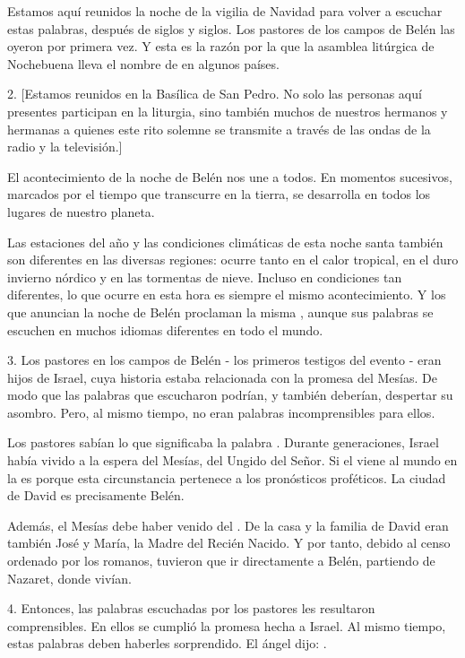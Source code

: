 \begin{body}
\begin{body}
		Estamos aquí reunidos la noche de la vigilia de Navidad para volver a escuchar estas palabras, después de siglos y siglos. Los pastores de los campos de Belén las oyeron por primera vez. Y esta es la razón por la que la asamblea litúrgica de Nochebuena lleva el nombre de  en algunos países.
		
		2. {[}Estamos reunidos en la Basílica de San Pedro. No solo las personas aquí presentes participan en la liturgia, sino también muchos de nuestros hermanos y hermanas a quienes este rito solemne se transmite a través de las ondas de la radio y la televisión.{]}
		
		El acontecimiento de la noche de Belén nos une a todos. En momentos sucesivos, marcados por el tiempo que transcurre en la tierra, se desarrolla en todos los lugares de nuestro planeta.
		
		Las estaciones del año y las condiciones climáticas de esta noche santa también son diferentes en las diversas regiones: ocurre tanto en el calor tropical, en el duro invierno nórdico y en las tormentas de nieve. Incluso en condiciones tan diferentes, lo que ocurre en esta hora es siempre el mismo acontecimiento. Y los que anuncian la noche de Belén proclaman la misma , aunque sus palabras se escuchen en muchos idiomas diferentes en todo el mundo.
		
		3. Los pastores en los campos de Belén - los primeros testigos del evento - eran hijos de Israel, cuya historia estaba relacionada con la promesa del Mesías. De modo que las palabras que escucharon podrían, y también deberían, despertar su asombro. Pero, al mismo tiempo, no eran palabras incomprensibles para ellos.
		
		Los pastores sabían lo que significaba la palabra . Durante generaciones, Israel había vivido a la espera del Mesías, del Ungido del Señor. Si el  viene al mundo en la  es porque esta circunstancia pertenece a los pronósticos proféticos. La ciudad de David es precisamente Belén.
		
		Además, el Mesías debe haber venido del . De la casa y la familia de David eran también José y María, la Madre del Recién Nacido. Y por tanto, debido al censo ordenado por los romanos, tuvieron que ir directamente a Belén, partiendo de Nazaret, donde vivían.
		
		4. Entonces, las palabras escuchadas por los pastores les resultaron comprensibles. En ellos se cumplió la promesa hecha a Israel. Al mismo tiempo, estas palabras deben haberles sorprendido. El ángel dijo: .
		

\end{body}
\end{body}
